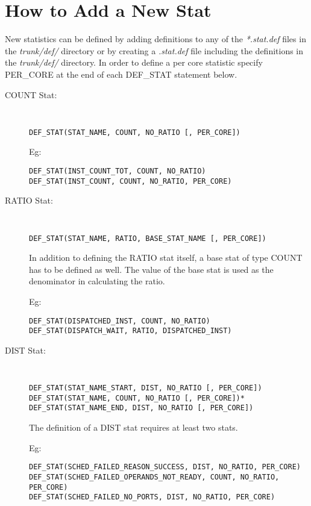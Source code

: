 \section{How to Add a New Stat}

New statistics can be defined by adding definitions to any of the
\textit{*.stat.def} files in the \textit{trunk/def/} directory or by creating a
\textit{.stat.def} file including the definitions in the \textit{trunk/def/}
directory.  In order to define a per core statistic specify PER\_CORE at the
end of each DEF\_STAT statement below.



\begin{description}

\item[COUNT Stat:] \Verb+ +

\Verb+DEF_STAT(STAT_NAME, COUNT, NO_RATIO [, PER_CORE])+

Eg: 
\begin{Verbatim}
DEF_STAT(INST_COUNT_TOT, COUNT, NO_RATIO)
DEF_STAT(INST_COUNT, COUNT, NO_RATIO, PER_CORE)
\end{Verbatim}

\item[RATIO Stat:] \Verb+ +

\Verb+DEF_STAT(STAT_NAME, RATIO, BASE_STAT_NAME [, PER_CORE])+


In addition to defining the RATIO stat itself, a base stat of type COUNT has to
be defined as well. The value of the base stat is used as the denominator in
calculating the ratio. 

Eg: 
\begin{Verbatim}
DEF_STAT(DISPATCHED_INST, COUNT, NO_RATIO)
DEF_STAT(DISPATCH_WAIT, RATIO, DISPATCHED_INST)
\end{Verbatim}

\item[DIST Stat:] \Verb+ +

\begin{Verbatim}
DEF_STAT(STAT_NAME_START, DIST, NO_RATIO [, PER_CORE])
DEF_STAT(STAT_NAME, COUNT, NO_RATIO [, PER_CORE])*
DEF_STAT(STAT_NAME_END, DIST, NO_RATIO [, PER_CORE])
\end{Verbatim}

The definition of a DIST stat requires at least two stats.

Eg: 
\begin{Verbatim}
DEF_STAT(SCHED_FAILED_REASON_SUCCESS, DIST, NO_RATIO, PER_CORE)
DEF_STAT(SCHED_FAILED_OPERANDS_NOT_READY, COUNT, NO_RATIO, PER_CORE)
DEF_STAT(SCHED_FAILED_NO_PORTS, DIST, NO_RATIO, PER_CORE)
\end{Verbatim}

\end{description}



